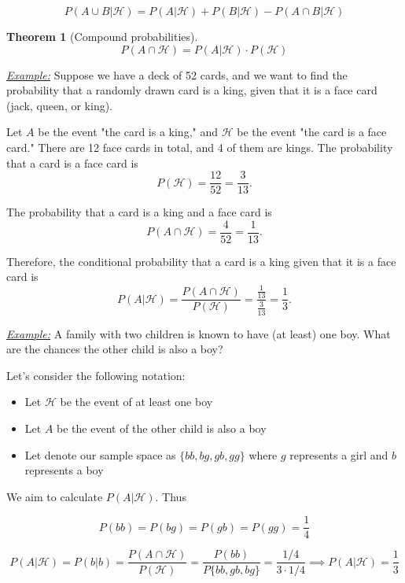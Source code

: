 \documentclass[a4paper,10pt]{article}
\newtheorem{theorem}{Theorem}
\begin{document}
\begin{equation}
    P(A \cup B | \mathcal{H}) = P(A | \mathcal{H}) + P(B | \mathcal{H}) - P(A \cap B | \mathcal{H})
\end{equation}

\begin{theorem}[Compound probabilities]
    \begin{equation}
        P(A \cap \mathcal{H}) = P(A | \mathcal{H}) \cdot P(\mathcal{H})
    \end{equation}
\end{theorem}

\noindent\textit{\underline{Example:}} Suppose we have a deck of 52 cards, and we want to find the probability that a randomly drawn card is a king, given that it is a face card (jack, queen, or king). 

Let $A$ be the event "the card is a king," and $\mathcal{H}$ be the event "the card is a face card." There are 12 face cards in total, and 4 of them are kings. The probability that a card is a face card is
$$
P(\mathcal{H}) = \frac{12}{52} = \frac{3}{13}.
$$

The probability that a card is a king and a face card is
$$
P(A \cap \mathcal{H}) = \frac{4}{52} = \frac{1}{13}.
$$

Therefore, the conditional probability that a card is a king given that it is a face card is
$$
P(A | \mathcal{H}) = \frac{P(A \cap \mathcal{H})}{P(\mathcal{H})} = \frac{\frac{1}{13}}{\frac{3}{13}} = \frac{1}{3}.
$$

\noindent\textit{\underline{Example:}} A family with two children is known to have (at least) one boy. What are the chances the other child is also a boy?

Let's consider the following notation:

\begin{itemize}
    \item Let $\mathcal{H}$ be the event of at least one boy
    \item Let $A$ be the event of the other child is also a boy
    \item Let denote our sample space as $\{bb, bg, gb, gg\}$ where $g$ represents a girl and $b$ represents a boy
\end{itemize}

We aim to calculate $P(A | \mathcal{H})$. Thus

\[
    P(bb) = P(bg) = P(gb) = P(gg) = \frac{1}{4}
\]

\[
    P(A | \mathcal{H}) = P(b | b) = \frac{P(A \cap \mathcal{H})}{P(\mathcal{H})} = \frac{P(bb)}{P\{bb, gb, bg\}} = \frac{1/4}{3 \cdot 1/4} \implies P(A | \mathcal{H}) = \frac{1}{3}
\]
\end{document}
